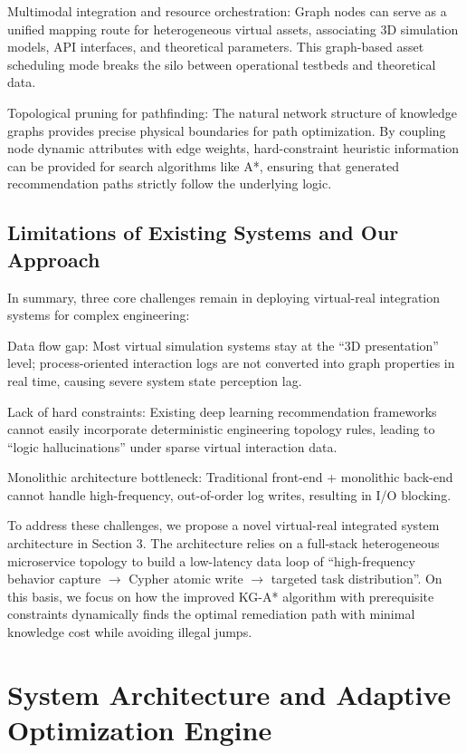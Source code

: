\documentclass{ieeeaccess}
\begin{document}
Multimodal integration and resource orchestration: Graph nodes can serve as a unified mapping route for heterogeneous virtual assets, associating 3D simulation models, API interfaces, and theoretical parameters. This graph-based asset scheduling mode breaks the silo between operational testbeds and theoretical data.

Topological pruning for pathfinding: The natural network structure of knowledge graphs provides precise physical boundaries for path optimization. By coupling node dynamic attributes with edge weights, hard-constraint heuristic information can be provided for search algorithms like A*, ensuring that generated recommendation paths strictly follow the underlying logic.

\subsection{Limitations of Existing Systems and Our Approach}
In summary, three core challenges remain in deploying virtual-real integration systems for complex engineering:

Data flow gap: Most virtual simulation systems stay at the ``3D presentation'' level; process-oriented interaction logs are not converted into graph properties in real time, causing severe system state perception lag.

Lack of hard constraints: Existing deep learning recommendation frameworks cannot easily incorporate deterministic engineering topology rules, leading to ``logic hallucinations'' under sparse virtual interaction data.

Monolithic architecture bottleneck: Traditional front-end + monolithic back-end cannot handle high-frequency, out-of-order log writes, resulting in I/O blocking.

To address these challenges, we propose a novel virtual-real integrated system architecture in Section 3. The architecture relies on a full-stack heterogeneous microservice topology to build a low-latency data loop of ``high-frequency behavior capture $\rightarrow$ Cypher atomic write $\rightarrow$ targeted task distribution''. On this basis, we focus on how the improved KG-A* algorithm with prerequisite constraints dynamically finds the optimal remediation path with minimal knowledge cost while avoiding illegal jumps.

\section{System Architecture and Adaptive Optimization Engine}
\label{sec:architecture}
\end{document}

